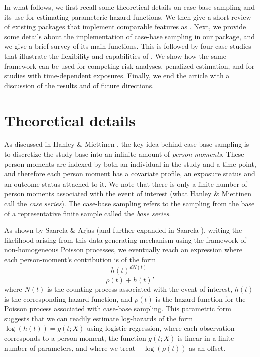 \documentclass[
]{jss}
\begin{document}
In what follows, we first recall some theoretical details on case-base
sampling and its use for estimating parameteric hazard functions. We
then give a short review of existing  packages that
implement comparable features as . Next, we provide some
details about the implementation of case-base sampling in our package,
and we give a brief survey of its main functions. This is followed by
four case studies that illustrate the flexibility and capabilities of
. We show how the same framework can be used for competing
risk analyses, penalized estimation, and for studies with time-dependent
exposures. Finally, we end the article with a discussion of the results
and of future directions.

\hypertarget{theoretical-details}{%
\section{Theoretical details}\label{theoretical-details}}

As discussed in Hanley \& Miettinen \citeyearpar{hanley2009fitting}, the
key idea behind case-base sampling is to discretize the study base into
an infinite amount of \emph{person moments}. These person moments are
indexed by both an individual in the study and a time point, and
therefore each person moment has a covariate profile, an exposure status
and an outcome status attached to it. We note that there is only a
finite number of person moments associated with the event of interest
(what Hanley \& Miettinen call the \emph{case series}). The case-base
sampling refers to the sampling from the base of a representative finite
sample called the \emph{base series}.

As shown by Saarela \& Arjas \citeyearpar{saarela2015non} (and further
expanded in Saarela \citeyearpar{saarela2016case}), writing the
likelihood arising from this data-generating mechanism using the
framework of non-homogeneous Poisson processes, we eventually reach an
expression where each person-moment's contribution is of the form
\[\frac{h(t)^{dN(t)}}{\rho(t) + h(t)},\] where \(N(t)\) is the counting
process associated with the event of interest, \(h(t)\) is the
corresponding hazard function, and \(\rho(t)\) is the hazard function
for the Poisson process associated with case-base sampling. This
parametric form suggests that we can readily estimate log-hazards of the
form \(\log(h(t)) = g(t; X)\) using logistic regression, where each
observation corresponds to a person moment, the function \(g(t; X)\) is
linear in a finite number of parameters, and where we treat
\(-\log(\rho(t))\) as an offset.
\end{document}
